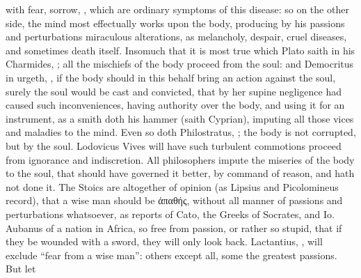 with fear, sorrow, \etc{}, which are ordinary symptoms of this disease: so on
the other side, the mind most effectually works upon the body, producing by his
passions and perturbations miraculous alterations, as melancholy, despair,
cruel diseases, and sometimes death itself. Insomuch that it is most true which
Plato saith in his Charmides, ; all
the mischiefs of the body proceed from the soul: and
Democritus in \Plutarch{} urgeth, , if the body should in this behalf bring an action against the soul,
surely the soul would be cast and convicted, that by her supine negligence had
caused such inconveniences, having authority over the body, and using it for an
instrument, as a smith doth his hammer (saith Cyprian),
imputing all those vices and maladies to the mind. Even so doth
Philostratus, ; the body is not corrupted, but by the soul. Lodovicus Vives
will have such turbulent commotions proceed from ignorance and indiscretion.
All philosophers impute the miseries of the body to the
soul, that should have governed it better, by command of reason, and hath not
done it. The Stoics are altogether of opinion (as Lipsius
and Picolomineus record), that a wise man should be
\textgreek{ἀπαθής}, without all manner of passions and perturbations
whatsoever, as \Seneca{} reports of Cato, the
Greeks of Socrates, and Io. Aubanus
of a nation in Africa, so free from passion, or rather so stupid, that if they
be wounded with a sword, they will only look back.
Lactantius, , will exclude
\enquote{fear from a wise man}: others except all, some the greatest passions. But let
